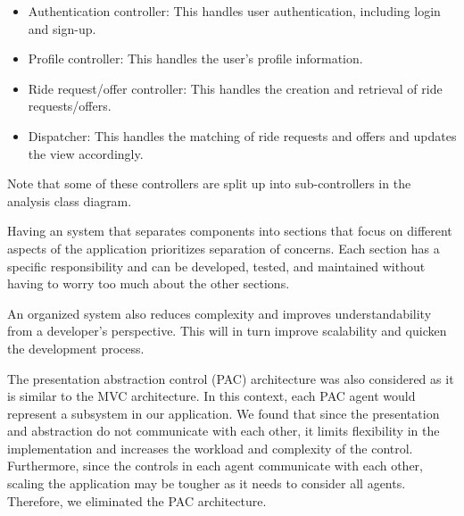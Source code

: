 \documentclass[]{article}
\begin{document}
\begin{itemize}
    \begin{itemize}
        \item Authentication controller: This handles user authentication, including login and sign-up.
        \item Profile controller: This handles the user's profile information.
        \item Ride request/offer controller: This handles the creation and retrieval of ride requests/offers.
        \item Dispatcher: This handles the matching of ride requests and offers and updates the view accordingly.
    \end{itemize}
    Note that some of these controllers are split up into sub-controllers in the analysis class diagram.
\end{itemize}

Having an system that separates components into sections that focus on different aspects of the application prioritizes separation of concerns. Each section has a specific responsibility and can be developed, tested, and maintained without having to worry too much about the other sections. 

An organized system also reduces complexity and improves understandability from a developer's perspective. This will in turn improve scalability and quicken the development process.

The presentation abstraction control (PAC) architecture was also considered as it is similar to the MVC architecture. In this context, each PAC agent would represent a subsystem in our application. We found that since the presentation and abstraction do not communicate with each other, it limits flexibility in the implementation and increases the workload and complexity of the control. Furthermore, since the controls in each agent communicate with each other, scaling the application may be tougher as it needs to consider all agents. Therefore, we eliminated the PAC architecture.
\end{document}
